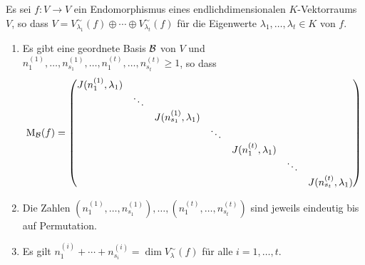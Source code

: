 \begin{theorem}
  Es sei $f \colon V \to V$ ein Endomorphismus eines endlichdimensionalen $K$-Vektorraums $V$, so dass $V = V^\sim_{\lambda_1}(f) \oplus \dotsb \oplus V^\sim_{\lambda_t}(f)$ für die Eigenwerte $\lambda_1, \dotsc, \lambda_t \in K$ von $f$.
  \begin{enumerate}[leftmargin=*, label=\roman*)]
    \item
      Es gibt eine geordnete Basis $\mathcal{B}$ von $V$ und $n^{(1)}_1, \dotsc, n^{(1)}_{s_1}, \dotsc, n^{(t)}_1, \dotsc, n^{(t)}_{s_t} \geq 1$, so dass
      \[
        \mathrm{M}_{\mathcal{B}}(f)
        =
        \begin{pmatrix}
          J(n^{(1)}_1, \lambda_1) &         &                             &         &                         &         &                             \\
                                  & \ddots  &                             &         &                         &         &                             \\
                                  &         & J(n^{(1)}_{s_1}, \lambda_1) &         &                         &         &                             \\
                                  &         &                             & \ddots  &                         &         &                             \\
                                  &         &                             &         & J(n^{(t)}_1, \lambda_1) &         &                             \\
                                  &         &                             &         &                         & \ddots  &                             \\
                                  &         &                             &         &                         &         & J(n^{(t)}_{s_t}, \lambda_1)
        \end{pmatrix}
      \]
    \item
      Die Zahlen $(n^{(1)}_1, \dotsc, n^{(1)}_{s_1}), \dotsc, (n^{(t)}_1, \dotsc, n^{(t)}_{s_t})$ sind jeweils eindeutig bis auf Permutation.
    \item
      Es gilt $n^{(i)}_1 + \dotsb + n^{(i)}_{s_i} = \dim V^\sim_\lambda(f)$ für alle $i = 1, \dotsc, t$.
  \end{enumerate}
\end{theorem}











